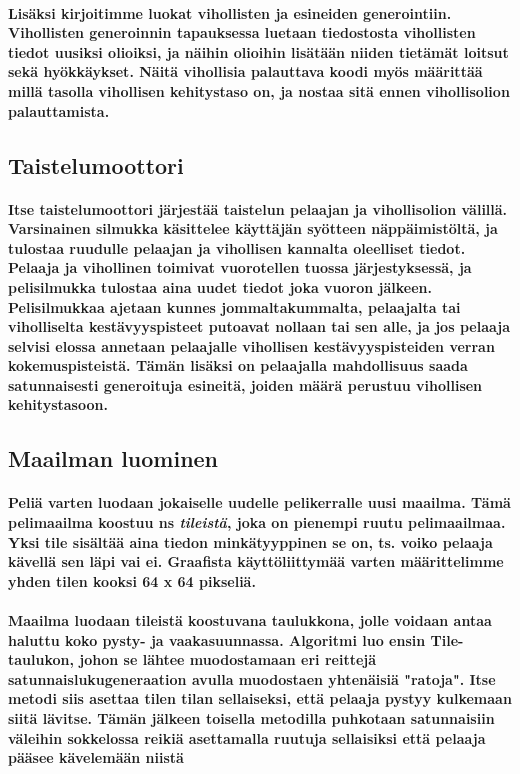 \documentclass[10pt,a4paper,draft]{article}
\begin{document}
\paragraph{Lisäksi kirjoitimme luokat vihollisten ja esineiden generointiin. Vihollisten generoinnin tapauksessa luetaan tiedostosta vihollisten tiedot uusiksi olioiksi, ja näihin olioihin lisätään niiden tietämät loitsut sekä hyökkäykset. Näitä vihollisia palauttava koodi myös määrittää millä tasolla vihollisen kehitystaso on, ja nostaa sitä ennen vihollisolion palauttamista.}

\subsection{Taistelumoottori}
\paragraph{Itse taistelumoottori järjestää taistelun pelaajan ja vihollisolion välillä. Varsinainen silmukka käsittelee käyttäjän syötteen näppäimistöltä, ja tulostaa ruudulle pelaajan ja vihollisen kannalta oleelliset tiedot. Pelaaja ja vihollinen toimivat vuorotellen tuossa järjestyksessä, ja pelisilmukka tulostaa aina uudet tiedot joka vuoron jälkeen. Pelisilmukkaa ajetaan kunnes jommaltakummalta, pelaajalta tai viholliselta kestävyys\-pisteet putoavat nollaan tai sen alle, ja jos pelaaja selvisi elossa annetaan pelaajalle vihollisen kestävyyspisteiden verran kokemuspisteistä. Tämän lisäksi on pelaajalla mahdollisuus saada satunnaisesti generoituja esineitä, joiden määrä perustuu vihollisen kehitystasoon. }

\subsection{Maailman luominen}
\paragraph{Peliä varten luodaan jokaiselle uudelle pelikerralle uusi maailma. Tämä pelimaailma koostuu ns \emph{tileistä}, joka on pienempi ruutu pelimaailmaa. Yksi tile sisältää aina tiedon minkätyyppinen se on, ts. voiko pelaaja kävellä sen läpi vai ei. Graafista käyttöliittymää varten määrittelimme yhden tilen kooksi 64 x 64 pikseliä.}
\paragraph{Maailma luodaan tileistä koostuvana taulukkona, jolle voidaan antaa haluttu koko pysty- ja vaakasuunnassa. Algoritmi luo ensin Tile-taulukon, johon se lähtee muodostamaan eri reittejä satunnaislukugeneraation avulla muodostaen yhtenäisiä "ratoja". Itse metodi siis asettaa tilen tilan sellaiseksi, että pelaaja pystyy kulkemaan siitä lävitse. Tämän jälkeen toisella metodilla puhkotaan satunnaisiin väleihin sokkelossa reikiä asettamalla ruutuja sellaisiksi että pelaaja pääsee kävelemään niistä}
\end{document}
